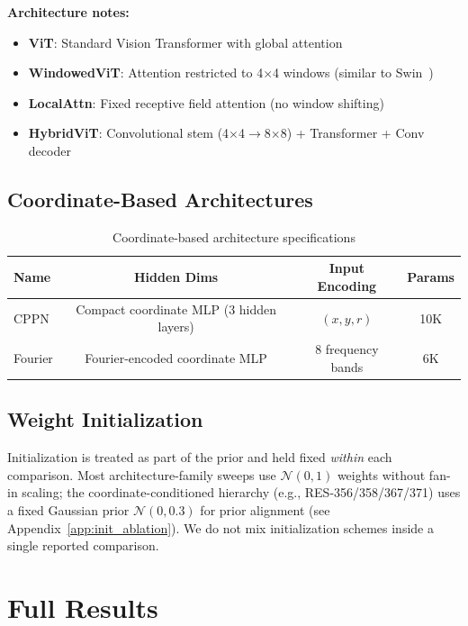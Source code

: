 \textbf{Architecture notes:}
\begin{itemize}
    \item \textbf{ViT}: Standard Vision Transformer with global attention
    \item \textbf{WindowedViT}: Attention restricted to 4$\times$4 windows (similar to Swin~\cite{liu2021swin})
    \item \textbf{LocalAttn}: Fixed receptive field attention (no window shifting)
    \item \textbf{HybridViT}: Convolutional stem (4$\times$4$\to$8$\times$8) + Transformer + Conv decoder
\end{itemize}

\subsection{Coordinate-Based Architectures}

\begin{table}[H]
\centering
\caption{Coordinate-based architecture specifications}
\begin{tabular}{lccc}
\toprule
Name & Hidden Dims & Input Encoding & Params \\
\midrule
CPPN & Compact coordinate MLP (3 hidden layers) & $(x, y, r)$ & 10K \\
Fourier & Fourier-encoded coordinate MLP & 8 frequency bands & 6K \\
\bottomrule
\end{tabular}
\end{table}

\subsection{Weight Initialization}

Initialization is treated as part of the prior and held fixed \emph{within} each comparison. Most architecture-family sweeps use $\mathcal{N}(0,1)$ weights without fan-in scaling; the coordinate-conditioned hierarchy (e.g., RES-356/358/367/371) uses a fixed Gaussian prior $\mathcal{N}(0,0.3)$ for prior alignment (see Appendix~\ref{app:init_ablation}). We do not mix initialization schemes inside a single reported comparison.




\section{Full Results}
\label{app:results}

